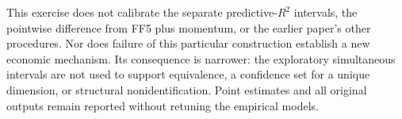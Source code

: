 This exercise does not calibrate the separate predictive-$R^2$ intervals,
the pointwise difference from FF5 plus momentum, or the earlier paper's other
procedures. Nor does failure of this particular construction establish a new
economic mechanism. Its consequence is narrower: the exploratory simultaneous
intervals are not used to support equivalence, a confidence set for a unique
dimension, or structural nonidentification. Point estimates and all original
outputs remain reported without retuning the empirical models.
